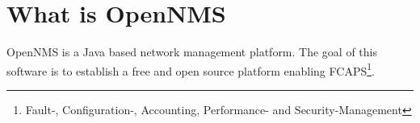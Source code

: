 \section{What is OpenNMS}
OpenNMS is a Java based network management platform. The goal of this software is to establish a free and open source platform enabling FCAPS\footnote{Fault-, Configuration-, Accounting, Performance- and Security-Management}.